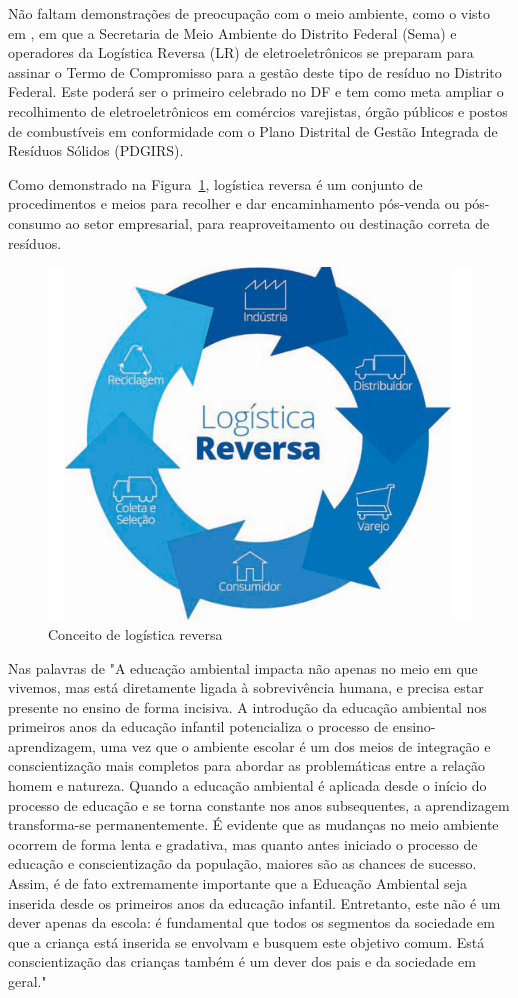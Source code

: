 Não faltam demonstrações de preocupação com o meio ambiente, como o visto em , em que a Secretaria de Meio Ambiente do Distrito Federal (Sema) e operadores da Logística Reversa (LR) de eletroeletrônicos se preparam para assinar o Termo de Compromisso para a gestão deste tipo de resíduo no Distrito Federal. Este poderá ser o primeiro celebrado no DF e tem como meta ampliar o recolhimento de eletroeletrônicos em comércios varejistas, órgão públicos e postos de combustíveis em conformidade com o Plano Distrital de Gestão Integrada de Resíduos Sólidos (PDGIRS).

Como demonstrado na Figura~\ref{fig:logistica-reversa}, logística reversa é um conjunto de procedimentos e meios para recolher e dar encaminhamento pós-venda ou pós-consumo ao setor empresarial, para reaproveitamento ou destinação correta de resíduos.

\begin{figure}[h]
    \centering
    \includegraphics[width=0.7\linewidth]{fig/Logistica-Reversa}
    \caption[Conceito de logística reversa]{Conceito de logística reversa}
    \label{fig:logistica-reversa}
\end{figure}



Nas palavras de  "A educação ambiental impacta não apenas no meio em que vivemos, mas está diretamente ligada à
sobrevivência humana, e precisa estar presente no ensino de forma incisiva.
A introdução da educação ambiental nos primeiros anos da educação infantil potencializa o
processo de ensino-aprendizagem, uma vez que o ambiente escolar é um dos meios de integração e
conscientização mais completos para abordar as problemáticas entre a relação homem e natureza.
Quando a educação ambiental é aplicada desde o início do processo de educação e se torna
constante nos anos subsequentes, a aprendizagem transforma-se permanentemente.
É evidente que as mudanças no meio ambiente ocorrem de forma lenta e gradativa, mas quanto
antes iniciado o processo de educação e conscientização da população, maiores são as chances de
sucesso. Assim, é de fato extremamente importante que a Educação Ambiental seja inserida desde
os primeiros anos da educação infantil.
Entretanto, este não é um dever apenas da escola: é fundamental que todos os segmentos da
sociedade em que a criança está inserida se envolvam e busquem este objetivo comum. Está
conscientização das crianças também é um dever dos pais e da sociedade em geral."

